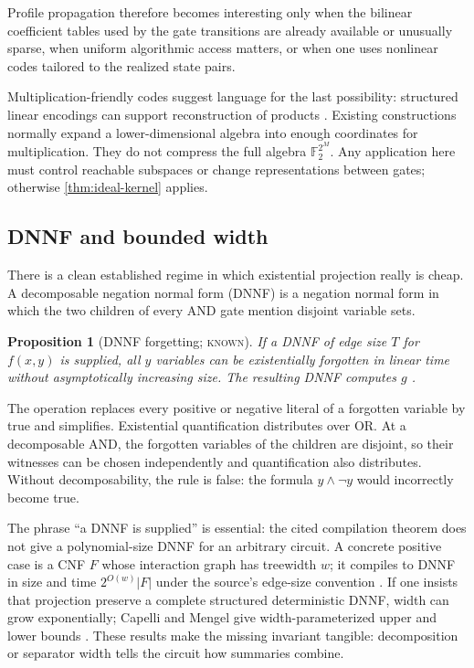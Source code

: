\documentclass[11pt]{article}
\newtheorem{proposition}[proposition]{Proposition}
\theoremstyle{definition}
\theoremstyle{remark}
\newcommand{\F}{\mathbb F}
\newcommand{\status}[1]{\textsc{#1}}
\begin{document}
Profile propagation therefore becomes interesting only when the bilinear
coefficient tables used by the gate transitions are already available or
unusually sparse, when uniform algorithmic access matters, or when one uses
nonlinear codes tailored to the realized state pairs.

Multiplication-friendly codes suggest language for the last possibility:
structured linear encodings can support reconstruction of products
\cite{CascudoEtAl2012}.  Existing constructions normally expand a
lower-dimensional algebra into enough coordinates for multiplication.  They
do not compress the full algebra $\F_2^{2^M}$.  Any application here must
control reachable subspaces or change representations between gates; otherwise
\cref{thm:ideal-kernel} applies.

\subsection{DNNF and bounded width}

There is a clean established regime in which existential projection really is
cheap.  A decomposable negation normal form (DNNF) is a negation normal form in
which the two children of every AND gate mention disjoint variable sets.

\begin{proposition}[DNNF forgetting; \status{known}]
\label{prop:dnnf}
If a DNNF of edge size $T$ for $f(x,y)$ is supplied, all $y$ variables can be
existentially forgotten in linear time without asymptotically increasing
size.  The resulting DNNF computes $g$ \cite{Darwiche1999,Darwiche2001}.
\end{proposition}

The operation replaces every positive or negative literal of a forgotten
variable by true and simplifies.  Existential quantification distributes over
OR.  At a decomposable AND, the forgotten variables of the children are
disjoint, so their witnesses can be chosen independently and quantification
also distributes.  Without decomposability, the rule is false: the formula
$y\wedge\neg y$ would incorrectly become true.

The phrase ``a DNNF is supplied'' is essential: the cited compilation theorem
does not give a polynomial-size DNNF for an arbitrary circuit.  A concrete
positive case is a CNF $F$ whose interaction graph has treewidth $w$; it
compiles to DNNF in size and time $2^{O(w)}|F|$ under the source's edge-size
convention \cite{Darwiche1999,Darwiche2001}.  If one insists that projection
preserve a complete structured deterministic DNNF, width can grow
exponentially;
Capelli and Mengel give width-parameterized upper and lower bounds
\cite{CapelliMengel2019}.  These results make the missing invariant tangible:
decomposition or separator width tells the circuit how summaries combine.
\end{document}
